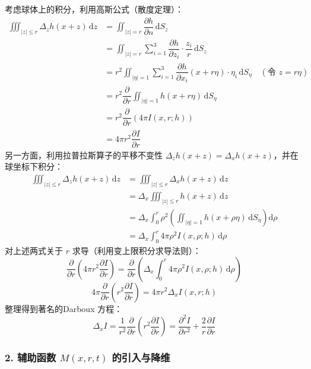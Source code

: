 \documentclass[12pt,a4paper]{ctexart}
\begin{document}
	考虑球体上的积分，利用高斯公式（散度定理）：
	\begin{align*}
		\iiint_{|z| \le r} \Delta_z h(x+z) \, \mathrm{d}z &= \iint_{|z|=r} \dfrac{\partial h}{\partial n} \, \mathrm{d}S_z \\
		&= \iint_{|z|=r} \sum_{i=1}^3 \dfrac{\partial h}{\partial z_i} \cdot \dfrac{z_i}{r} \, \mathrm{d}S_z \\
		&= r^2 \iint_{|\eta|=1} \sum_{i=1}^3 \dfrac{\partial h}{\partial x_i}(x+r\eta) \cdot \eta_i \, \mathrm{d}S_\eta \quad (\text{令 } z=r\eta) \\
		&= r^2 \dfrac{\partial}{\partial r} \iint_{|\eta|=1} h(x+r\eta) \, \mathrm{d}S_\eta \\
		&= r^2 \dfrac{\partial}{\partial r} \left( 4\pi I(x,r;h) \right) \\
		&= 4\pi r^2 \dfrac{\partial I}{\partial r}
	\end{align*}
	另一方面，利用拉普拉斯算子的平移不变性 $\Delta_z h(x+z) = \Delta_x h(x+z)$，并在球坐标下积分：
	\begin{align*}
		\iiint_{|z| \le r} \Delta_z h(x+z) \, \mathrm{d}z &= \iiint_{|z| \le r} \Delta_x h(x+z) \, \mathrm{d}z \\
		&= \Delta_x \iiint_{|z| \le r} h(x+z) \, \mathrm{d}z \\
		&= \Delta_x \int_0^r \rho^2 \left( \iint_{|\eta|=1} h(x+\rho\eta) \, \mathrm{d}S_\eta \right) \mathrm{d}\rho \\
		&= \Delta_x \int_0^r 4\pi \rho^2 I(x,\rho;h) \, \mathrm{d}\rho
	\end{align*}
	对上述两式关于 $r$ 求导（利用变上限积分求导法则）：
	\[
	\dfrac{\partial}{\partial r} \left( 4\pi r^2 \dfrac{\partial I}{\partial r} \right) = \dfrac{\partial}{\partial r} \left( \Delta_x \int_0^r 4\pi \rho^2 I(x,\rho;h) \, \mathrm{d}\rho \right)
	\]
	\[
	4\pi \dfrac{\partial}{\partial r} \left( r^2 \dfrac{\partial I}{\partial r} \right) = 4\pi r^2 \Delta_x I(x,r;h)
	\]
	整理得到著名的Darboux 方程：
	\begin{equation}
		\Delta_x I = \dfrac{1}{r^2} \dfrac{\partial}{\partial r} \left( r^2 \dfrac{\partial I}{\partial r} \right) = \dfrac{\partial^2 I}{\partial r^2} + \dfrac{2}{r} \dfrac{\partial I}{\partial r}
		\label{eq:darboux}
	\end{equation}
	
	\subsubsection*{2. 辅助函数 $M(x,r,t)$ 的引入与降维}
	
\end{document}
